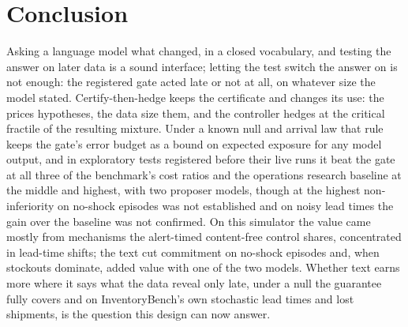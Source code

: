 \section{Conclusion}
\label{sec:conclusion}

Asking a language model what changed, in a closed vocabulary, and testing the answer on later
data is a sound interface; letting the test switch the answer on is not enough: the registered
gate acted late or not at all, on whatever size the model stated. Certify-then-hedge keeps the
certificate and changes its use: the \eprocess{} prices hypotheses, the data size them, and the
controller hedges at the critical fractile of the resulting mixture. Under a known null and arrival law that
rule keeps the gate's error budget as a bound on expected exposure for any model output, and in
exploratory tests registered before their live runs it beat the gate at all three of the
benchmark's cost ratios and the operations research baseline at the middle and highest, with two
proposer models, though at the highest non-inferiority on no-shock episodes was not
established and on noisy lead times the gain over the baseline was not confirmed. On this
simulator the value came mostly from mechanisms the alert-timed content-free control shares,
concentrated in lead-time shifts; the text cut commitment on no-shock episodes and, when
stockouts dominate, added value with one of the two models. Whether text earns more where it
says what the data reveal only late, under a null the guarantee fully covers and on
InventoryBench's own stochastic lead times and lost shipments, is the question this design can
now answer.
